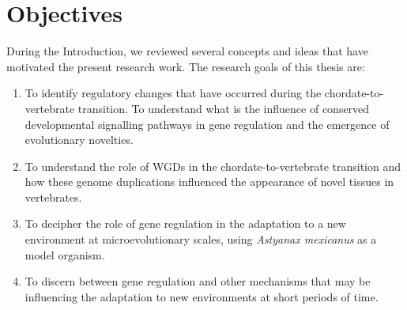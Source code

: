 
\chapter{Objectives}

During the Introduction, we reviewed several concepts and ideas that have motivated the present research work. The research goals of this thesis are:

\begin{enumerate}
    \item To identify regulatory changes that have occurred during the chordate-to-vertebrate transition. To understand what is the influence of conserved developmental signalling pathways in gene regulation and the emergence of evolutionary novelties.
    \item To understand the role of WGDs in the chordate-to-vertebrate transition and how these genome duplications influenced the appearance of novel tissues in vertebrates.
    \item To decipher the role of gene regulation in the adaptation to a new environment at microevolutionary scales, using \textit{Astyanax mexicanus} as a model organism.
    \item To discern between gene regulation and other mechanisms that may be influencing the adaptation to new environments at short periods of time.
\end{enumerate}
